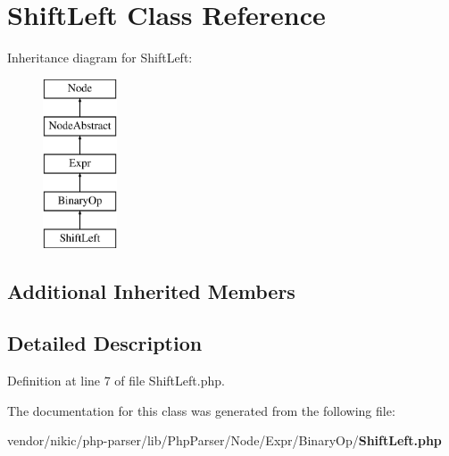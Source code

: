 \section{Shift\+Left Class Reference}
\label{class_php_parser_1_1_node_1_1_expr_1_1_binary_op_1_1_shift_left}
Inheritance diagram for Shift\+Left\+:\begin{figure}[H]
\begin{center}
\leavevmode
\includegraphics[height=5.000000cm]{class_php_parser_1_1_node_1_1_expr_1_1_binary_op_1_1_shift_left}
\end{center}
\end{figure}
\subsection*{Additional Inherited Members}


\subsection{Detailed Description}


Definition at line 7 of file Shift\+Left.\+php.



The documentation for this class was generated from the following file\+:\begin{DoxyCompactItemize}
\item 
vendor/nikic/php-\/parser/lib/\+Php\+Parser/\+Node/\+Expr/\+Binary\+Op/{\bf Shift\+Left.\+php}\end{DoxyCompactItemize}
